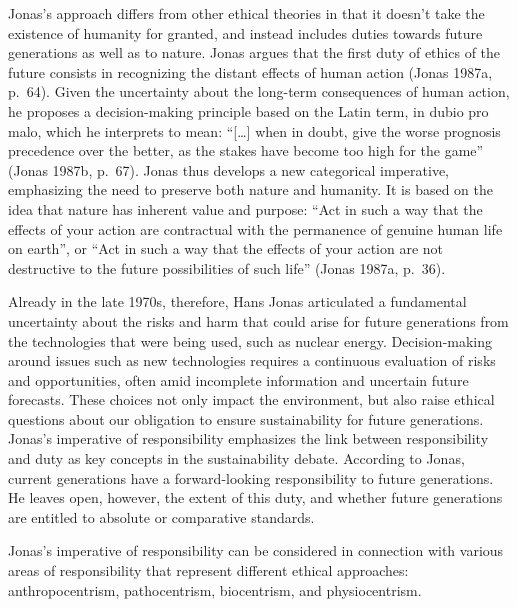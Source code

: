 \documentclass[
  a4paper,
  openany]{book}
\begin{document}
Jonas's approach differs from other ethical theories in that it doesn't
take the existence of humanity for granted, and instead includes duties
towards future generations as well as to nature. Jonas argues that the
first duty of ethics of the future consists in recognizing the distant
effects of human action (Jonas 1987a, p.~64). Given the uncertainty
about the long-term consequences of human action, he proposes a
decision-making principle based on the Latin term, in dubio pro malo,
which he interprets to mean: ``{[}\ldots{]} when in doubt, give the
worse prognosis precedence over the better, as the stakes have become
too high for the game'' (Jonas 1987b, p.~67). Jonas thus develops a new
categorical imperative, emphasizing the need to preserve both nature and
humanity. It is based on the idea that nature has inherent value and
purpose: ``Act in such a way that the effects of your action are
contractual with the permanence of genuine human life on earth'', or
``Act in such a way that the effects of your action are not destructive
to the future possibilities of such life'' (Jonas 1987a, p.~36).

Already in the late 1970s, therefore, Hans Jonas articulated a
fundamental uncertainty about the risks and harm that could arise for
future generations from the technologies that were being used, such as
nuclear energy. Decision-making around issues such as new technologies
requires a continuous evaluation of risks and opportunities, often amid
incomplete information and uncertain future forecasts. These choices not
only impact the environment, but also raise ethical questions about our
obligation to ensure sustainability for future generations. Jonas's
imperative of responsibility emphasizes the link between responsibility
and duty as key concepts in the sustainability debate. According to
Jonas, current generations have a forward-looking responsibility to
future generations. He leaves open, however, the extent of this duty,
and whether future generations are entitled to absolute or comparative
standards.

Jonas's imperative of responsibility can be considered in connection
with various areas of responsibility that represent different ethical
approaches: anthropocentrism, pathocentrism, biocentrism, and
physiocentrism.
\end{document}
